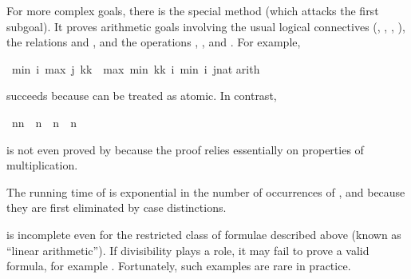 \begin{isabellebody}
\begin{isamarkuptext}
For more complex goals, there is the special method 
(which attacks the first subgoal). It proves arithmetic goals involving the
usual logical connectives (\isa{{\isasymnot}}, \isa{{\isasymand}}, \isa{{\isasymor}},
\isa{{\isasymlongrightarrow}}), the relations \isa{{\isasymle}} and \isa{{\isacharless}}, and the operations
\isa{{\isacharplus}}, \isa{{\isacharminus}},  and . For example,%
\end{isamarkuptext}%
\ {\isachardoublequote}min\ i\ {\isacharparenleft}max\ j\ {\isacharparenleft}k{\isacharasterisk}k{\isacharparenright}{\isacharparenright}\ {\isacharequal}\ max\ {\isacharparenleft}min\ {\isacharparenleft}k{\isacharasterisk}k{\isacharparenright}\ i{\isacharparenright}\ {\isacharparenleft}min\ i\ {\isacharparenleft}j{\isacharcolon}{\isacharcolon}nat{\isacharparenright}{\isacharparenright}{\isachardoublequote}\isanewline
{}arith{\isacharparenright}%
\begin{isamarkuptext}%
\noindent
succeeds because  can be treated as atomic. In contrast,%
\end{isamarkuptext}%
\ {\isachardoublequote}n{\isacharasterisk}n\ {\isacharequal}\ n\ {\isasymLongrightarrow}\ n{\isacharequal}{}\ {\isasymor}\ n{\isacharequal}{}{\isachardoublequote}%
\begin{isamarkuptext}%
\noindent
is not even proved by  because the proof relies essentially
on properties of multiplication.

\begin{warn}
  The running time of  is exponential in the number of occurrences
  of ,  and
   because they are first eliminated by case distinctions.

   is incomplete even for the restricted class of formulae
  described above (known as ``linear arithmetic''). If divisibility plays a
  role, it may fail to prove a valid formula, for example
  . Fortunately, such examples are rare in practice.
\end{warn}%
\end{isamarkuptext}%
\end{isabellebody}%
